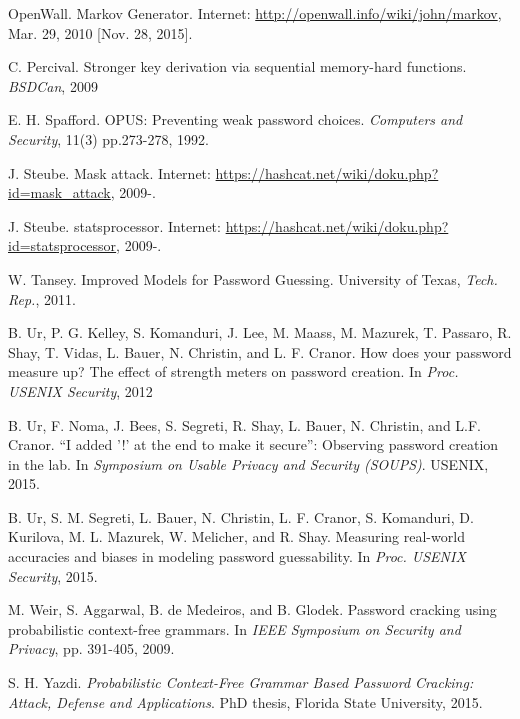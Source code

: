 \documentclass{article} %
\theoremstyle{definition}
\theoremstyle{theorem}
\theoremstyle{remark}
\theoremstyle{remark}
\begin{document}
\begin{thebibliography}{9}
OpenWall. Markov Generator. Internet: \url{http://openwall.info/wiki/john/markov}, Mar. 29, 2010 [Nov. 28, 2015].

C. Percival. Stronger key derivation via sequential memory-hard functions. \textit{BSDCan}, 2009

E. H. Spafford. OPUS: Preventing weak password choices. \textit{Computers and Security}, 11(3) pp.273-278, 1992.

J. Steube. Mask attack. Internet: \url{https://hashcat.net/wiki/doku.php?id=mask_attack}, 2009-.

J. Steube. statsprocessor. Internet: \url{https://hashcat.net/wiki/doku.php?id=statsprocessor}, 2009-.

W. Tansey. Improved Models for Password Guessing. University of Texas, \textit{Tech. Rep.}, 2011.

B. Ur, P. G. Kelley, S. Komanduri, J. Lee, M. Maass, M. Mazurek, T. Passaro, R. Shay, T. Vidas, L. Bauer, N. Christin, and L. F. Cranor. How does your password measure up? The effect of strength meters on password creation. In \emph{Proc. USENIX Security}, 2012

B. Ur, F. Noma, J. Bees, S. Segreti, R. Shay, L. Bauer, N. Christin, and L.F. Cranor. ``I added ’!’ at the end to make it secure'': Observing password creation in the lab. In \textit{Symposium on Usable Privacy and Security (SOUPS)}. USENIX, 2015.

B. Ur, S. M. Segreti, L. Bauer, N. Christin, L. F. Cranor, S. Komanduri, D. Kurilova, M. L. Mazurek, W. Melicher, and R. Shay. Measuring real-world accuracies and biases in modeling password guessability. In \textit{Proc. USENIX Security}, 2015.

M. Weir, S. Aggarwal, B. de Medeiros, and B. Glodek. Password cracking using probabilistic context-free grammars. In \emph{IEEE Symposium on Security and Privacy}, pp. 391-405, 2009.

S. H. Yazdi. \emph{Probabilistic Context-Free Grammar Based Password Cracking: Attack, Defense and Applications}. PhD thesis, Florida State University, 2015.
\end{thebibliography}

\vspace{\fill}
\pagebreak
\end{document}
